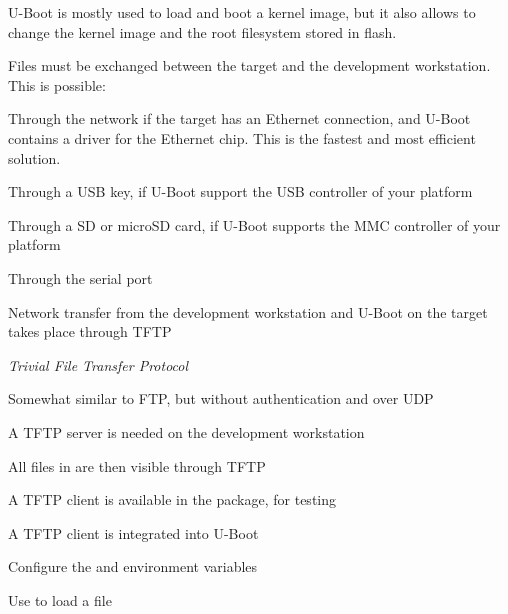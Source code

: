   \startitemize
  \item U-Boot is mostly used to load and boot a kernel image, but it
    also allows to change the kernel image and the root filesystem
    stored in flash.
  \item Files must be exchanged between the target and the development
    workstation. This is possible:
    \startitemize
    \item Through the network if the target has an Ethernet
      connection, and U-Boot contains a driver for the Ethernet
      chip. This is the fastest and most efficient solution.
    \item Through a USB key, if U-Boot support the USB controller of
      your platform
    \item Through a SD or microSD card, if U-Boot supports the MMC
      controller of your platform
    \item Through the serial port
    \stopitemize
  \stopitemize

  \startitemize
  \item Network transfer from the development workstation and U-Boot
    on the target takes place through TFTP
    \startitemize
    \item {\em Trivial File Transfer Protocol}
    \item Somewhat similar to FTP, but without authentication and over
      UDP
    \stopitemize
  \item A TFTP server is needed on the development workstation
    \startitemize
    \item {}
    \item All files in  are then visible
      through TFTP
    \item A TFTP client is available in the  package,
      for testing
    \stopitemize
  \item A TFTP client is integrated into U-Boot
    \startitemize
    \item Configure the  and  environment
      variables
    \item Use  to load a file
    \stopitemize
  \stopitemize


